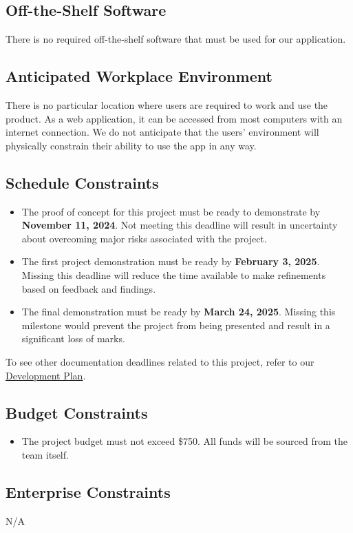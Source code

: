 \documentclass[12pt]{article}
\begin{document}
\subsection{Off-the-Shelf Software}
There is no required off-the-shelf software that must be used for our application.
\subsection{Anticipated Workplace Environment}
There is no particular location where users are required to work and use the product. As a web application, it can be accessed from most computers with an internet connection. We do not anticipate that the users' environment will physically constrain their ability to use the app in any way.
\subsection{Schedule Constraints}
\begin{itemize}
  \item The proof of concept for this project must be ready to demonstrate by \textbf{November 11, 2024}. Not meeting this deadline will result in uncertainty about overcoming major risks associated with the project.
  \item The first project demonstration must be ready by \textbf{February 3, 2025}. Missing this deadline will reduce the time available to make refinements based on feedback and findings.
  \item The final demonstration must be ready by \textbf{March 24, 2025}. Missing this milestone would prevent the project from being presented and result in a significant loss of marks.
\end{itemize}
To see other documentation deadlines related to this project, refer to our \href{https://github.com/OKKM-insights/OKKM.insights/blob/main/docs/DevelopmentPlan/DevelopmentPlan.pdf}{Development Plan}. 
\subsection{Budget Constraints}
\begin{itemize}
  \item The project budget must not exceed \$750. All funds will be sourced from the team itself.
\end{itemize}
\subsection{Enterprise Constraints}
N/A
\newpage
\end{document}
